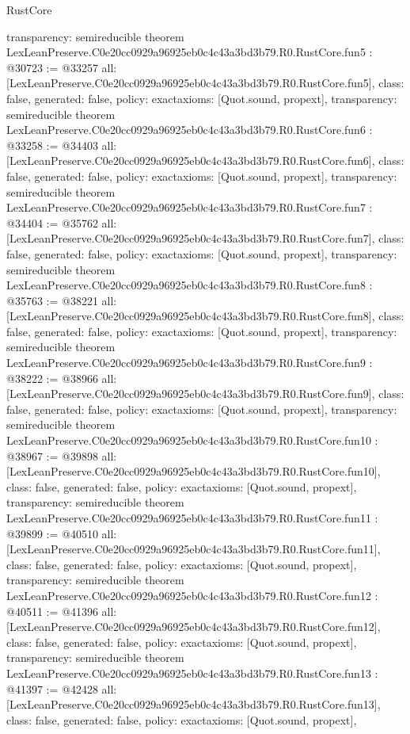 \begin{lexlean}{RustCore}
\begin{coremodule}
{  transparency: semireducible
}
theorem LexLeanPreserve.C0e20cc0929a96925eb0c4c43a3bd3b79.R0.RustCore.fun5 : @30723 := @33257 {
  all: [LexLeanPreserve.C0e20cc0929a96925eb0c4c43a3bd3b79.R0.RustCore.fun5],
  class: false,
  generated: false,
  policy: exact{axioms: [Quot.sound, propext]},
  transparency: semireducible
}
theorem LexLeanPreserve.C0e20cc0929a96925eb0c4c43a3bd3b79.R0.RustCore.fun6 : @33258 := @34403 {
  all: [LexLeanPreserve.C0e20cc0929a96925eb0c4c43a3bd3b79.R0.RustCore.fun6],
  class: false,
  generated: false,
  policy: exact{axioms: [Quot.sound, propext]},
  transparency: semireducible
}
theorem LexLeanPreserve.C0e20cc0929a96925eb0c4c43a3bd3b79.R0.RustCore.fun7 : @34404 := @35762 {
  all: [LexLeanPreserve.C0e20cc0929a96925eb0c4c43a3bd3b79.R0.RustCore.fun7],
  class: false,
  generated: false,
  policy: exact{axioms: [Quot.sound, propext]},
  transparency: semireducible
}
theorem LexLeanPreserve.C0e20cc0929a96925eb0c4c43a3bd3b79.R0.RustCore.fun8 : @35763 := @38221 {
  all: [LexLeanPreserve.C0e20cc0929a96925eb0c4c43a3bd3b79.R0.RustCore.fun8],
  class: false,
  generated: false,
  policy: exact{axioms: [Quot.sound, propext]},
  transparency: semireducible
}
theorem LexLeanPreserve.C0e20cc0929a96925eb0c4c43a3bd3b79.R0.RustCore.fun9 : @38222 := @38966 {
  all: [LexLeanPreserve.C0e20cc0929a96925eb0c4c43a3bd3b79.R0.RustCore.fun9],
  class: false,
  generated: false,
  policy: exact{axioms: [Quot.sound, propext]},
  transparency: semireducible
}
theorem LexLeanPreserve.C0e20cc0929a96925eb0c4c43a3bd3b79.R0.RustCore.fun10 : @38967 := @39898 {
  all: [LexLeanPreserve.C0e20cc0929a96925eb0c4c43a3bd3b79.R0.RustCore.fun10],
  class: false,
  generated: false,
  policy: exact{axioms: [Quot.sound, propext]},
  transparency: semireducible
}
theorem LexLeanPreserve.C0e20cc0929a96925eb0c4c43a3bd3b79.R0.RustCore.fun11 : @39899 := @40510 {
  all: [LexLeanPreserve.C0e20cc0929a96925eb0c4c43a3bd3b79.R0.RustCore.fun11],
  class: false,
  generated: false,
  policy: exact{axioms: [Quot.sound, propext]},
  transparency: semireducible
}
theorem LexLeanPreserve.C0e20cc0929a96925eb0c4c43a3bd3b79.R0.RustCore.fun12 : @40511 := @41396 {
  all: [LexLeanPreserve.C0e20cc0929a96925eb0c4c43a3bd3b79.R0.RustCore.fun12],
  class: false,
  generated: false,
  policy: exact{axioms: [Quot.sound, propext]},
  transparency: semireducible
}
theorem LexLeanPreserve.C0e20cc0929a96925eb0c4c43a3bd3b79.R0.RustCore.fun13 : @41397 := @42428 {
  all: [LexLeanPreserve.C0e20cc0929a96925eb0c4c43a3bd3b79.R0.RustCore.fun13],
  class: false,
  generated: false,
  policy: exact{axioms: [Quot.sound, propext]},
}
\end{coremodule}
\end{lexlean}
